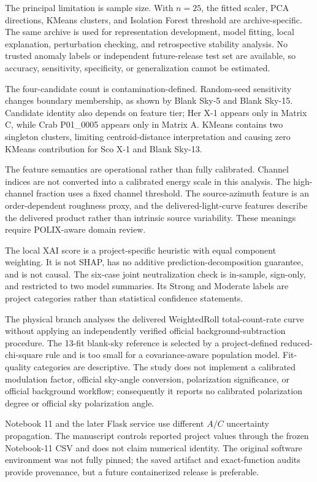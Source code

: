 \documentclass[conference]{IEEEtran}
\begin{document}
The principal limitation is sample size. With $n=25$, the fitted scaler, PCA directions, KMeans clusters, and Isolation Forest threshold are archive-specific. The same archive is used for representation development, model fitting, local explanation, perturbation checking, and retrospective stability analysis. No trusted anomaly labels or independent future-release test set are available, so accuracy, sensitivity, specificity, or generalization cannot be estimated.


The four-candidate count is contamination-defined. Random-seed sensitivity changes boundary membership, as shown by Blank Sky-5 and Blank Sky-15. Candidate identity also depends on feature tier; Her X-1 appears only in Matrix C, while Crab P01\_0005 appears only in Matrix A. KMeans contains two singleton clusters, limiting centroid-distance interpretation and causing zero KMeans contribution for Sco X-1 and Blank Sky-13.


The feature semantics are operational rather than fully calibrated. Channel indices are not converted into a calibrated energy scale in this analysis. The high-channel fraction uses a fixed channel threshold. The source-azimuth feature is an order-dependent roughness proxy, and the delivered-light-curve features describe the delivered product rather than intrinsic source variability. These meanings require POLIX-aware domain review.


The local XAI score is a project-specific heuristic with equal component weighting. It is not SHAP, has no additive prediction-decomposition guarantee, and is not causal. The six-case joint neutralization check is in-sample, sign-only, and restricted to two model summaries. Its Strong and Moderate labels are project categories rather than statistical confidence statements.


The physical branch analyses the delivered WeightedRoll total-count-rate curve without applying an independently verified official background-subtraction procedure. The 13-fit blank-sky reference is selected by a project-defined reduced-chi-square rule and is too small for a covariance-aware population model. Fit-quality categories are descriptive. The study does not implement a calibrated modulation factor, official sky-angle conversion, polarization significance, or official background workflow; consequently it reports no calibrated polarization degree or official sky polarization angle.


Notebook 11 and the later Flask service use different $A/C$ uncertainty propagation. The manuscript controls reported project values through the frozen Notebook-11 CSV and does not claim numerical identity. The original software environment was not fully pinned; the saved artifact and exact-function audits provide provenance, but a future containerized release is preferable.
\end{document}
